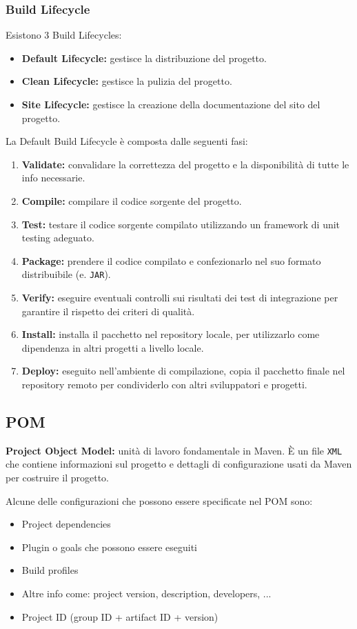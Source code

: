 \subsubsection{Build Lifecycle}
Esistono 3 Build Lifecycles:
\begin{itemize}
    \item \textbf{Default Lifecycle:} gestisce la distribuzione del progetto.
    \item \textbf{Clean Lifecycle:} gestisce la pulizia del progetto.
    \item \textbf{Site Lifecycle:} gestisce la creazione della documentazione del sito del progetto.
\end{itemize}
La Default Build Lifecycle è composta dalle seguenti fasi:
\begin{enumerate}
    \item \textbf{Validate:} convalidare la correttezza del progetto e la disponibilità di tutte le info necessarie.
    \item \textbf{Compile:} compilare il codice sorgente del progetto.
    \item \textbf{Test:} testare il codice sorgente compilato utilizzando un framework di unit testing adeguato.
    \item \textbf{Package:} prendere il codice compilato e confezionarlo nel suo formato distribuibile (e. \verb|JAR|).
    \item \textbf{Verify:} eseguire eventuali controlli sui risultati dei test di integrazione per garantire il rispetto dei criteri di qualità.
    \item \textbf{Install:} installa il pacchetto nel repository locale, per utilizzarlo come dipendenza in altri progetti a livello locale.
    \item \textbf{Deploy:} eseguito nell'ambiente di compilazione, copia il pacchetto finale nel repository remoto per condividerlo con altri sviluppatori e progetti.
\end{enumerate}

\newpage
\subsection{POM}
\begin{mdframed}
    \textbf{Project Object Model:} unità di lavoro fondamentale in Maven. È un file \verb|XML| che contiene informazioni sul progetto e dettagli di configurazione usati da Maven per costruire il progetto.
\end{mdframed}
Alcune delle configurazioni che possono essere specificate nel POM sono:
\begin{itemize}
    \item Project dependencies
    \item Plugin o goals che possono essere eseguiti
    \item Build profiles
    \item Altre info come: project version, description, developers, ...
    \item Project ID (group ID + artifact ID + version)
\end{itemize}

